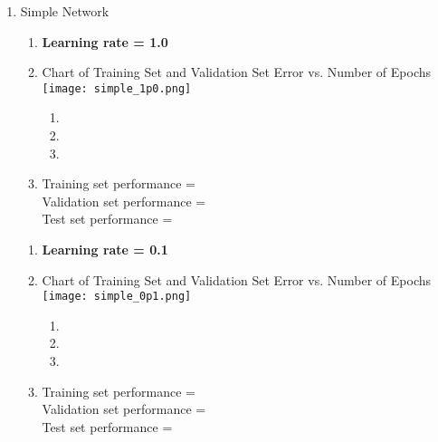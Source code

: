 \documentclass[12pt,letterpaper]{article}
\newcounter{partnumber}
\newcommand{\Part}{\stepcounter{partnumber}\item[(\arabic{partnumber})]}
\begin{document}
\begin{enumerate}
\begin{enumerate}
        \Part Simple Network \medskip
               \begin{enumerate}[label={\alph*) },ref={\alph*)}]
                \item \textbf{Learning rate = 1.0} \medskip
                \item Chart of Training Set and Validation Set Error vs. Number of Epochs\\
                        \texttt{[image: simple\_1p0.png]}
                        \begin{enumerate}[label={\roman*)},ref={\alph*)}]
                                \item
                                \item
                                \item
                        \end{enumerate} 
                        \bigskip
                \item Training set performance = \\
                      Validation set performance = \\
                      Test set performance = 
                      \bigskip                     
               \end{enumerate} \medskip
               \begin{enumerate}[label={\alph*) },ref={\alph*)}]
               \item \textbf{Learning rate = 0.1} \medskip
                \item Chart of Training Set and Validation Set Error vs. Number of Epochs \\
                        \texttt{[image: simple\_0p1.png]}
                        \begin{enumerate}[label={\roman*)},ref={\alph*)}]
                                \item
                                \item
                                \item
                        \end{enumerate} 
                        \bigskip
                \item Training set performance = \\
                      Validation set performance = \\
                      Test set performance = 
                      \bigskip
                \end{enumerate} \medskip
                

\end{enumerate}
\end{enumerate}
\end{document}
